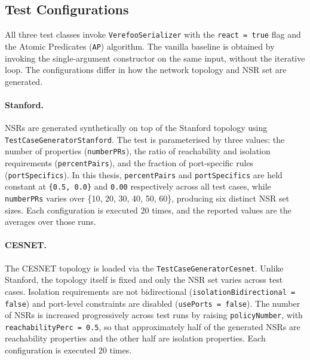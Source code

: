\subsection{Test Configurations}

All three test classes invoke \texttt{VerefooSerializer} with the \texttt{react = true} flag and the Atomic Predicates (\texttt{AP}) algorithm. The vanilla baseline is obtained by invoking the single-argument constructor on the same input, without the iterative loop. The configurations differ in how the network topology and NSR set are generated.

\paragraph{Stanford.}
NSRs are generated synthetically on top of the Stanford topology using \texttt{TestCaseGeneratorStanford}. The test is parameterised by three values: the number of properties (\texttt{numberPRs}), the ratio of reachability and isolation requirements (\texttt{percentPairs}), and the fraction of port-specific rules (\texttt{portSpecifics}). In this thesis, \texttt{percentPairs} and \texttt{portSpecifics} are held constant at \texttt{\{0.5, 0.0\}} and \texttt{0.00} respectively across all test cases, while \texttt{numberPRs} varies over \{10, 20, 30, 40, 50, 60\}, producing six distinct NSR set sizes. Each configuration is executed 20 times, and the reported values are the averages over those runs.

\paragraph{CESNET.}
The CESNET topology is loaded via the \texttt{TestCaseGeneratorCesnet}. Unlike Stanford, the topology itself is fixed and only the NSR set varies across test cases. Isolation requirements are not bidirectional (\texttt{isolationBidirectional = false}) and port-level constraints are disabled (\texttt{usePorts = false}). The number of NSRs is increased progressively across test runs by raising \texttt{policyNumber}, with \texttt{reachabilityPerc = 0.5}, so that approximately half of the generated NSRs are reachability properties and the other half are isolation properties. Each configuration is executed 20 times.

